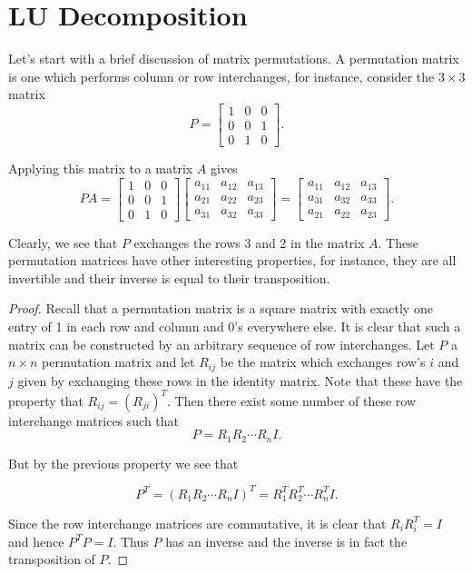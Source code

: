 \documentclass[12pt]{extarticle}
\newcommand{\m}[1]{\begin{bmatrix} #1 \end{bmatrix}}
\begin{document}
\section*{LU Decomposition}

Let's start with a brief discussion of matrix permutations. A permutation matrix is one which performs column or row interchanges, for instance, consider the $3 \times 3$ matrix
\[
  P = \m { 1 & 0 & 0 \\
       0 & 0 & 1 \\
       0 & 1 & 0 }.
\]

Applying this matrix to a matrix $A$ gives 
\[
  PA = \m{ 1 & 0 & 0 \\
           0 & 0 & 1 \\
           0 & 1 & 0 } 
       \m{ a_{11} & a_{12} & a_{13} \\ 
           a_{21} & a_{22} & a_{23} \\ 
           a_{31} & a_{32} & a_{33} }
     = \m{ a_{11} & a_{12} & a_{13} \\ 
           a_{31} & a_{32} & a_{33} \\
           a_{21} & a_{22} & a_{23}  }.
\]

Clearly, we see that $P$ exchanges the rows 3 and 2 in the matrix $A$. These permutation matrices have other interesting properties, for instance, they are all invertible and their inverse is equal to their transposition.

\begin{proof}
  Recall that a permutation matrix is a square matrix with exactly one entry of 1 in each row and column and 0's everywhere else. It is clear that such a matrix can be constructed by an arbitrary sequence of row interchanges. Let $P$ a $n \times n$ permutation matrix and let $R_{ij}$ be the matrix which exchanges row's $i$ and $j$ given by exchanging these rows in the identity matrix. Note that these have the property that $R_{ij} = (R_{ji})^T$. Then there exist some number of these row interchange matrices such that 
  \[
    P = R_1R_2 \cdots R_n I.
  \]
  
  But by the previous property we see that 
  
  \[
    P^T = (R_1R_2 \cdots R_n I)^T = R_1^TR_2^T \cdots R_n^T I.
  \]
  
  Since the row interchange matrices are commutative, it is clear that $R_i R^T_i = I$ and hence $P^TP = I$. Thus $P$ has an inverse and the inverse is in fact the transposition of $P$.
\end{proof}
\end{document}
